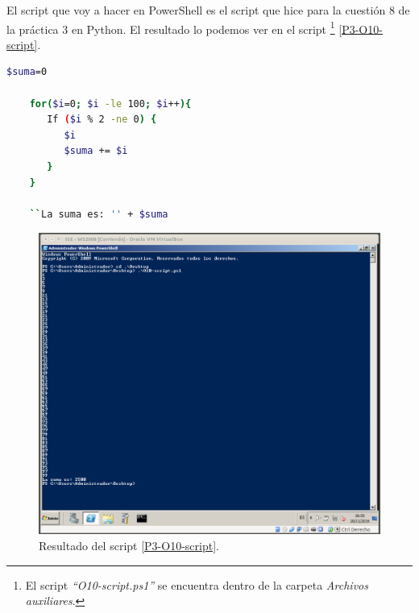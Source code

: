 \documentclass[a4paper,titlepage,12pt]{report}	%
\numberwithin{figure}{section} %
\numberwithin{table}{section} %
\begin{document}
	El script que voy a hacer en PowerShell es el script que hice para la cuestión 8 de la práctica 3 en Python. El resultado lo podemos ver en el script \footnote{El script \textit{``O10-script.ps1''} se encuentra dentro de la carpeta \textit{Archivos auxiliares}.} \ref{P3-O10-script}.

	\begin{lstlisting}[language=bash, xleftmargin=-1cm, breaklines=true, basicstyle=\footnotesize, label={P3-O10-script}]
	$suma=0

	for($i=0; $i -le 100; $i++){
	   If ($i % 2 -ne 0) {
	      $i
	      $suma += $i
	   }
	}

	``La suma es: '' + $suma
	\end{lstlisting}

	\begin{figure}[H]
		\centering
	   \includegraphics[scale=0.3]{./Imagenes/P3/O10-resultado.png}
	   \caption[Resultado del script \ref{P3-O10-script}.]{Resultado del script \ref{P3-O10-script}.}
	   \label{P3-O10-resultado}
	\end{figure}
\end{document}

